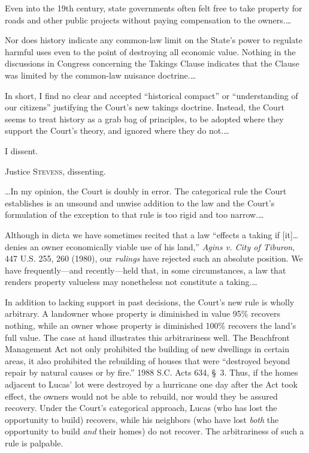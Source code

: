 Even into the 19th century, state governments often felt free to take property
for roads and other public projects without paying compensation to the
owners.\ldots

Nor does history indicate any common-law limit on the State's power to regulate
harmful uses even to the point of destroying all economic value. Nothing in the
discussions in Congress concerning the Takings Clause indicates that the Clause
was limited by the common-law nuisance doctrine.\ldots

In short, I find no clear and accepted ``historical compact'' or ``understanding
of our citizens'' justifying the Court's new takings doctrine. Instead, the
Court seems to treat history as a grab bag of principles, to be adopted where
they support the Court's theory, and ignored where they do not.\ldots

I dissent.

\opinion Justice \textsc{Stevens}, dissenting.

\ldots In my opinion, the Court is doubly in error. The categorical rule the
Court establishes is an unsound and unwise addition to the law and the Court's
formulation of the exception to that rule is too rigid and too narrow.\ldots

Although in dicta we have sometimes recited that a law ``effects a taking if
[it]\ldots denies an owner economically viable use of his land,'' \textit{Agins
v. City of Tiburon}, 447 U.S. 255, 260 (1980), our \textit{rulings} have
rejected such an absolute position. We have frequently---and recently---held
that, in some circumstances, a law that renders property valueless may
nonetheless not constitute a taking.\ldots

In addition to lacking support in past decisions, the Court's new rule is wholly
arbitrary. A landowner whose property is diminished in value 95\% recovers
nothing, while an owner whose property is diminished 100\% recovers the land's
full value. The case at hand illustrates this arbitrariness well. The Beachfront
Management Act not only prohibited the building of new dwellings in certain
areas, it also prohibited the rebuilding of houses that were ``destroyed beyond
repair by natural causes or by fire.'' 1988 S.C. Acts 634, \S~3. Thus, if the
homes adjacent to Lucas' lot were destroyed by a hurricane one day after the Act
took effect, the owners would not be able to rebuild, nor would they be assured
recovery. Under the Court's categorical approach, Lucas (who has lost the
opportunity to build) recovers, while his neighbors (who have lost \textit{both}
the opportunity to build \textit{and} their homes) do not recover. The
arbitrariness of such a rule is palpable.

